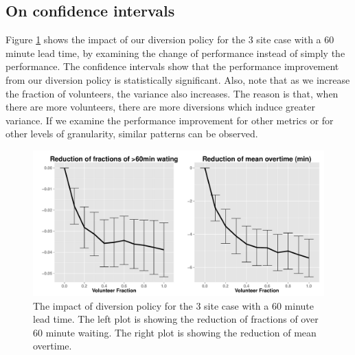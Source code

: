 \subsection{On confidence intervals}

Figure \ref{fig:ci} shows the impact of our diversion policy
for the 3 site case with a 60 minute lead time, by examining the
change of performance instead of simply the performance.
The confidence intervals show that the performance improvement
from our diversion policy is statistically
significant. Also, note that as we increase the fraction of
volunteers, the variance also increases. The reason is that,
when there are more volunteers, there are more diversions which
induce greater variance. If we examine the performance improvement
for other metrics or for other levels of granularity, similar patterns
can be observed.

\begin{figure}[htp]
\centering
\includegraphics[width=.95\textwidth]{chap3/numeric/pic/ci}
\caption{The impact of diversion policy for the 3 site case
with a 60 minute lead time. The left plot is showing the
reduction of fractions of over 60 minute waiting. The right plot
is showing the reduction of mean overtime.}
\label{fig:ci}
\end{figure}
